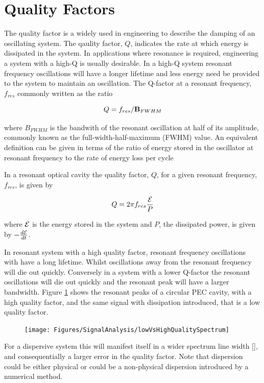 \section{Quality Factors}

The quality factor is a widely used in engineering to describe the damping of an
oscillating system. The qaulity factor, $Q$, indicates the rate at which energy
is dissipated in the system. In applications where resonance is required,
engineering a system with a high-Q is usually desirable. In a high-Q system
resonant frequency oscillations will have a longer lifetime and less energy need
be provided to the system to maintain an oscillation. The Q-factor at a resonant
frequency, $f_{res}$ commonly written as the ratio

$$
Q = f_{res}/\mathbf{B}_{FWHM}
$$

where $B_{FWHM}$ is the bandwith of the resonant oscillation at half of its
amplitude, commonly known as the full-width-half-maximum (FWHM) value. An
equivalent definition can be given in terms of the ratio of energy stored in the
oscillator at resonant frequency to the rate of energy loss per cycle

In a resonant optical cavity the quality factor, $Q$, for a given resonant
frequency, $f_{res}$, is given by

$$
Q = 2 \pi f_{res} \frac{\mathcal{E}}{P}
$$

where $\mathcal{E}$ is the energy stored in the system and $P$, the dissipated
power, is given by $-\frac{d \mathcal{E}}{dt}$.

In resonant system with a high quality factor, resonant frequency oscillations
with have a long lifetime. Whilst oscillations away from the resonant frequency
will die out quickly. Conversely in a system with a lower Q-factor the resonant
oscillations will die out quickly and the resonant peak will have a larger
bandwidth. Figure \ref{fig:signal-analysis-low-vs-high-q-spectrum} shows the
resonant peaks of a circular PEC cavity, with a high quality factor, and the
same signal with dissipation introduced, that is a low quality factor.

\begin{figure}
\begin{center}
    \texttt{[image: Figures/SignalAnalysis/lowVsHighQualitySpectrum]}
\end{center}
\caption{}
\label{fig:signal-analysis-low-vs-high-q-spectrum}
\end{figure}

For a dispersive system this will manifest itself in a wider spectrum line width
[], and consequentially a larger error in the quality factor. Note that
dispersion could be either physical or could be a non-physical dispersion
introduced by a numerical method.

